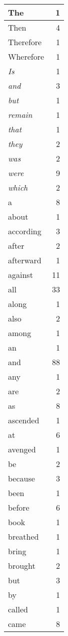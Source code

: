 \begin{center}
\begin{longtable}{l|r}
The & 1 \\ \hline
Then & 4 \\ \hline
Therefore & 1 \\ \hline
Wherefore & 1 \\ \hline
\emph{Is} & 1 \\ \hline
\emph{and} & 3 \\ \hline
\emph{but} & 1 \\ \hline
\emph{remain} & 1 \\ \hline
\emph{that} & 1 \\ \hline
\emph{they} & 2 \\ \hline
\emph{was} & 2 \\ \hline
\emph{were} & 9 \\ \hline
\emph{which} & 2 \\ \hline
a & 8 \\ \hline
about & 1 \\ \hline
according & 3 \\ \hline
after & 2 \\ \hline
afterward & 1 \\ \hline
against & 11 \\ \hline
all & 33 \\ \hline
along & 1 \\ \hline
also & 2 \\ \hline
among & 1 \\ \hline
an & 1 \\ \hline
and & 88 \\ \hline
any & 1 \\ \hline
are & 2 \\ \hline
as & 8 \\ \hline
ascended & 1 \\ \hline
at & 6 \\ \hline
avenged & 1 \\ \hline
be & 2 \\ \hline
because & 3 \\ \hline
been & 1 \\ \hline
before & 6 \\ \hline
book & 1 \\ \hline
breathed & 1 \\ \hline
bring & 1 \\ \hline
brought & 2 \\ \hline
but & 3 \\ \hline
by & 1 \\ \hline
called & 1 \\ \hline
came & 8 \\ \hline

\end{longtable}
\end{center}

